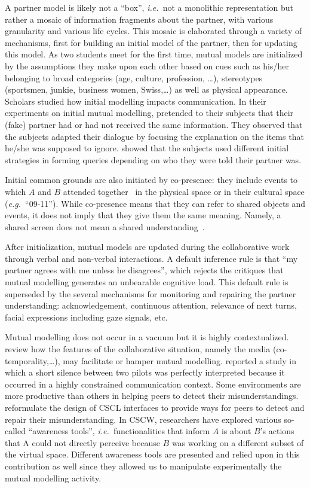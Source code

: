 \documentclass[natbib]{svjour3}
\newcommand{\ie}{{\textit{i.e.\ }}}
\newcommand{\eg}{{\textit{e.g.\ }}}
\begin{document}
A partner model is likely not a ``box'', \ie not a monolithic representation
but rather a mosaic of information fragments about the partner, with various
granularity and various life cycles. This mosaic is elaborated through a variety
of mechanisms, first for building an initial model of the partner, then for
updating this model. As two students meet for the first time, mutual models are
initialized by the assumptions they make upon each other based on cues such as
his/her belonging to broad categories (age, culture, profession, \ldots),
stereotypes (sportsmen, junkie, business women, Swiss,\ldots) as well as physical
appearance. Scholars studied how initial modelling impacts communication. In
their experiments on initial mutual modelling, \citet{slugoski1993attribution}
pretended to their subjects that their (fake) partner had or had not received
the same information. They observed that the subjects adapted their dialogue by
focusing the explanation on the items that he/she was supposed to ignore.
\citet{brennan1991conversation} showed that the subjects used different initial
strategies in forming queries depending on who they were told their partner was.  

Initial common grounds are also initiated by co-presence: they include events to
which $A$ and $B$ attended together~\citep{clark2002definite} in the physical
space or in their cultural space (\eg ``09-11''). While co-presence means that
they can refer to shared objects and events, it does not imply that they give
them the same meaning. Namely, a shared screen does not mean a shared
understanding~\citep{dillenbourg2006sharing}.

After initialization, mutual models are updated during the collaborative work
through verbal and non-verbal interactions. A default inference rule is that ``my
partner agrees with me unless he disagrees'', which rejects the critiques that
mutual modelling generates an unbearable cognitive load. This default rule is
superseded by the several mechanisms for monitoring and repairing the partner
understanding: acknowledgement, continuous attention, relevance of next turns,
facial expressions including gaze signals, etc.

Mutual modelling does not occur in a vacuum but it is highly contextualized.
\citet{clark1991grounding} review how the features of the collaborative
situation, namely the media (co-temporality,\ldots), may facilitate or hamper
mutual modelling.  \citet{hutchins1997constructing} reported a study in which a
short silence between two pilots was perfectly interpreted because it occurred
in a highly constrained communication context.  Some environments are more
productive than others in helping peers to detect their misunderstandings.
\citet{roschelle1995construction} reformulate the design of CSCL
interfaces to provide ways for peers to detect and repair their
misunderstanding. In CSCW, researchers have explored various so-called
``awareness tools'', \ie functionalities that inform $A$ is about $B$'s actions
that A could not directly perceive because $B$ was working on a different subset
of the virtual space. Different awareness tools are presented and relied upon in
this contribution as well since they allowed us to manipulate experimentally the
mutual modelling activity. 
\end{document}
